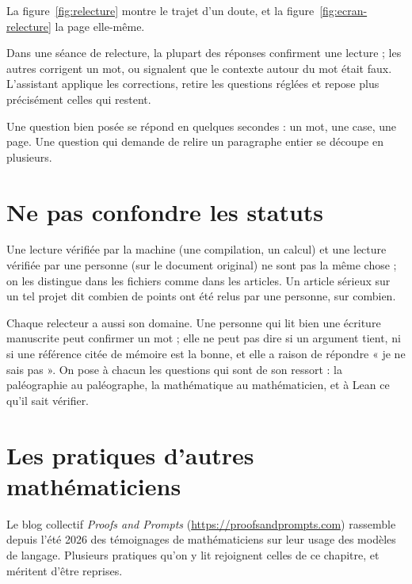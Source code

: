 La figure~\ref{fig:relecture} montre le trajet d'un doute, et la
figure~\ref{fig:ecran-relecture} la page elle-même.




\begin{exemple}
Dans une séance de relecture, la plupart des réponses confirment une lecture ; les autres corrigent un mot, ou signalent que
le contexte autour du mot était faux. L'assistant applique les corrections, retire les
questions réglées et repose plus précisément celles qui restent.
\end{exemple}

\begin{tipblock}
Une question bien posée se répond en quelques secondes : un mot, une case, une page. Une
question qui demande de relire un paragraphe entier se découpe en plusieurs.
\end{tipblock}

\section{Ne pas confondre les statuts}

Une lecture vérifiée par la machine (une compilation, un calcul) et une lecture vérifiée
par une personne (sur le document original) ne sont pas la même chose ; on les distingue
dans les fichiers comme dans les articles. Un article sérieux sur un tel projet dit combien
de points ont été relus par une personne, sur combien.

Chaque relecteur a aussi son domaine. Une personne qui lit bien une écriture manuscrite
peut confirmer un mot ; elle ne peut pas dire si un argument tient, ni si une référence
citée de mémoire est la bonne, et elle a raison de répondre « je ne sais pas ». On pose à
chacun les questions qui sont de son ressort : la paléographie au paléographe, la
mathématique au mathématicien, et à Lean ce qu'il sait vérifier.

\section{Les pratiques d'autres mathématiciens}

Le blog collectif \emph{Proofs and Prompts} (\url{https://proofsandprompts.com}) rassemble
depuis l'été 2026 des témoignages de mathématiciens sur leur usage des modèles de
langage. Plusieurs pratiques qu'on y lit rejoignent celles de ce chapitre, et méritent
d'être reprises.

